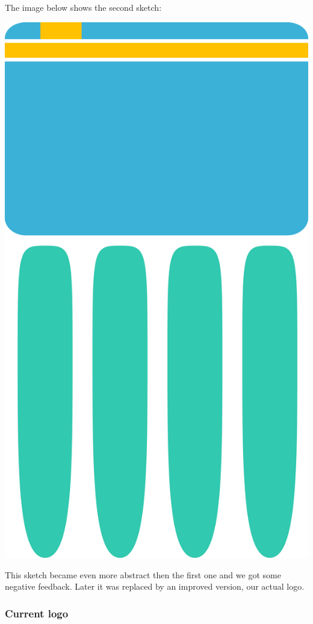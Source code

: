 The image below shows the second sketch:

\begin{center}
\includegraphics[scale=0.30]{images/logo_v02.png}
\end{center}

This sketch became even more abstract then the first one and we got some negative feedback. Later it was replaced by an improved version, our actual logo.

\subsubsection{Current logo}

